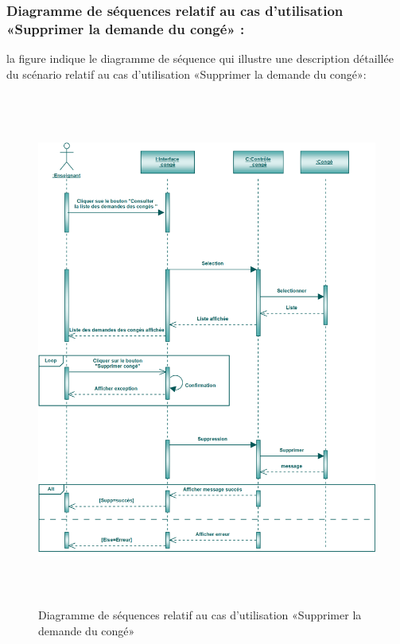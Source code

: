 \documentclass[12 pt ]{report}
\begin{document}
\subsubsection{Diagramme de séquences relatif au cas d’utilisation «Supprimer la demande du congé» :}
la figure   indique le diagramme de séquence qui illustre une description détaillée du scénario relatif au cas d’utilisation «Supprimer la demande du congé»: 
\begin{figure}[h]
 \begin{center}
\includegraphics[width= 18 cm ,height=  17cm]{ssc.PNG}
\caption{Diagramme de séquences relatif au cas d’utilisation «Supprimer la demande du congé»}

\end{center}
\end{figure}
\end{document}
